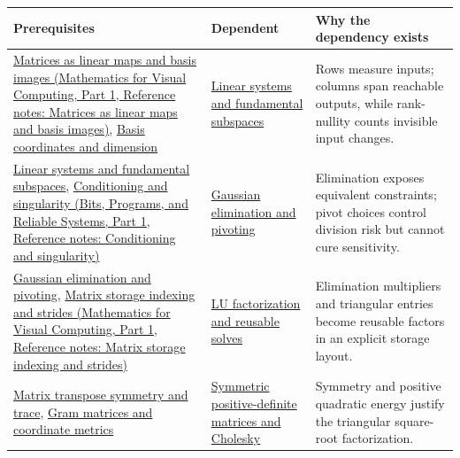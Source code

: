 {\def\LTcaptype{none} %
\begin{longtable}[]{@{}
  >{\raggedright\arraybackslash}p{}
  >{\raggedright\arraybackslash}p{}
  >{\raggedright\arraybackslash}p{}@{}}
\toprule\noalign{}
\begin{minipage}[b]{\linewidth}\raggedright
Prerequisites
\end{minipage} & \begin{minipage}[b]{\linewidth}\raggedright
Dependent
\end{minipage} & \begin{minipage}[b]{\linewidth}\raggedright
Why the dependency exists
\end{minipage} \\
\midrule\noalign{}
\endhead
\bottomrule\noalign{}
\endlastfoot
\href{../02-Mathematics-for-Visual-Computing-P01/main.pdf\#nameddest=appendix-bd39c3bf5d64}{Matrices as linear maps and basis images (Mathematics for Visual Computing, Part 1, Reference notes: Matrices as linear maps and basis images)}, \hyperref[appendix-ce0341f7ea0d]{Basis coordinates and dimension} & \hyperref[appendix-8572a4a060c1]{Linear systems and fundamental subspaces} & Rows measure inputs; columns span reachable outputs, while rank-nullity counts invisible input changes. \\
\hyperref[appendix-8572a4a060c1]{Linear systems and fundamental subspaces}, \href{../01-Bits-Programs-and-Reliable-Systems-P01/main.pdf\#nameddest=appendix-8f6a01f284a7}{Conditioning and singularity (Bits, Programs, and Reliable Systems, Part 1, Reference notes: Conditioning and singularity)} & \hyperref[appendix-f6e77f4a200f]{Gaussian elimination and pivoting} & Elimination exposes equivalent constraints; pivot choices control division risk but cannot cure sensitivity. \\
\hyperref[appendix-f6e77f4a200f]{Gaussian elimination and pivoting}, \href{../02-Mathematics-for-Visual-Computing-P01/main.pdf\#nameddest=appendix-ffdc1d4e5350}{Matrix storage indexing and strides (Mathematics for Visual Computing, Part 1, Reference notes: Matrix storage indexing and strides)} & \hyperref[appendix-55e4b5b0a1e6]{LU factorization and reusable solves} & Elimination multipliers and triangular entries become reusable factors in an explicit storage layout. \\
\hyperref[appendix-175ca5ff874d]{Matrix transpose symmetry and trace}, \hyperref[appendix-3b863809f82a]{Gram matrices and coordinate metrics} & \hyperref[appendix-50d2ea3c9b26]{Symmetric positive-definite matrices and Cholesky} & Symmetry and positive quadratic energy justify the triangular square-root factorization. \\

\end{longtable}}
